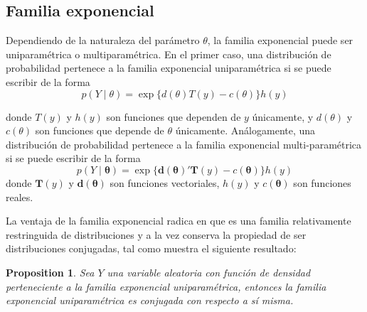 \documentclass[
  spanish,
  letter]{book}
\newtheorem{proposition}{Proposition}[chapter]
\theoremstyle{definition}
\theoremstyle{definition}
\theoremstyle{definition}
\theoremstyle{remark}
\begin{document}
\hypertarget{familia-exponencial}{%
\subsection{Familia exponencial}\label{familia-exponencial}}

Dependiendo de la naturaleza del parámetro \(\theta\), la familia exponencial puede ser uniparamétrica o multiparamétrica. En el primer caso, una distribución de probabilidad pertenece a la familia exponencial uniparamétrica si se puede escribir de la forma
\begin{equation}\label{uniexpo}
p(Y \mid \theta)=\exp\{d(\theta)T(y)-c(\theta)\}h(y)
\end{equation}

donde \(T(y)\) y \(h(y)\) son funciones que dependen de \(y\) únicamente, y \(d(\theta)\) y \(c(\theta)\) son funciones que depende de \(\theta\) únicamente. Análogamente, una distribución de probabilidad pertenece a la familia exponencial multi-paramétrica si se puede escribir de la forma
\begin{equation}\label{multiexpo}
p(Y \mid \boldsymbol \theta)=\exp\{\mathbf{d}(\boldsymbol \theta)'\mathbf{T}(y)-c(\boldsymbol \theta)\}h(y)
\end{equation}
donde \(\mathbf{T}(y)\) y \(\mathbf{d}(\boldsymbol \theta)\) son funciones vectoriales, \(h(y)\) y \(c(\boldsymbol \theta)\) son funciones reales.

La ventaja de la familia exponencial radica en que es una familia relativamente restringuida de distribuciones y a la vez conserva la propiedad de ser distribuciones conjugadas, tal como muestra el siguiente resultado:

\begin{proposition}
\protect\hypertarget{prp:unnamed-chunk-17}{}{\label{prp:unnamed-chunk-17} }Sea \(Y\) una variable aleatoria con función de densidad perteneciente a la familia exponencial uniparamétrica, entonces la familia exponencial uniparamétrica es conjugada con respecto a sí misma.
\end{proposition}
\end{document}
